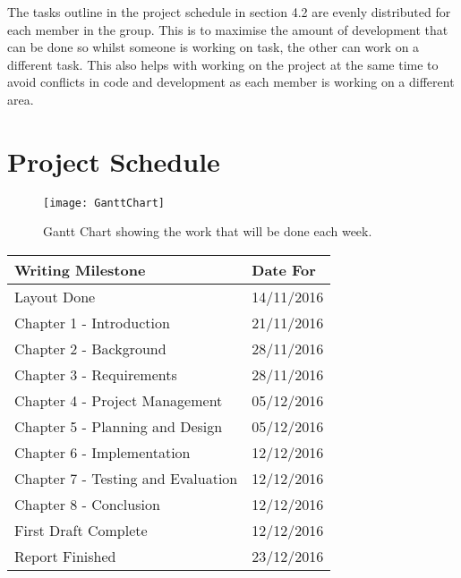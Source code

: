 \newline
\par
The tasks outline in the project schedule in section 4.2 are evenly distributed for each member in the group. This is to maximise the amount of development that can be done so whilst someone is working on task, the other can work on a different task. This also helps with working on the project at the same time to avoid conflicts in code and development as each member is working on a different area.
\section{Project Schedule}
\begin{figure}[H]
	\texttt{[image: GanttChart]}
	\centering
	\caption{Gantt Chart showing the work that will be done each week.}
	\label{fig:ganttChartPlan}
\end{figure}

\begin{tabular}{ |p{6cm}|p{3cm}| }
	\hline
	\textbf{Writing Milestone} & \textbf{Date For}
	\\\hline
	Layout Done & 14/11/2016
	\\\hline
	Chapter 1 - Introduction & 21/11/2016
	\\\hline
	Chapter 2 - Background & 28/11/2016
	\\\hline
	Chapter 3 - Requirements & 28/11/2016
	\\\hline
	Chapter 4 - Project Management & 05/12/2016
	\\\hline
	Chapter 5 - Planning and Design & 05/12/2016
	\\\hline
	Chapter 6 - Implementation & 12/12/2016
	\\\hline
	Chapter 7 - Testing and Evaluation & 12/12/2016
	\\\hline
	Chapter 8 - Conclusion & 12/12/2016
	\\\hline
	First Draft Complete & 12/12/2016
	\\\hline
	Report Finished & 23/12/2016
	\\\hline
\end{tabular}


